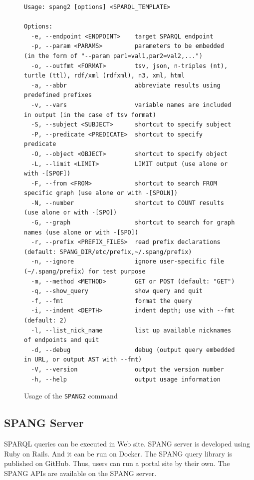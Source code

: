 \documentclass[runningheads]{llncs}
\begin{document}
\begin{figure}[!t]
\begin{scriptsize}
\begin{verbatim}
Usage: spang2 [options] <SPARQL_TEMPLATE>

Options:
  -e, --endpoint <ENDPOINT>    target SPARQL endpoint
  -p, --param <PARAMS>         parameters to be embedded (in the form of "--param par1=val1,par2=val2,...")
  -o, --outfmt <FORMAT>        tsv, json, n-triples (nt), turtle (ttl), rdf/xml (rdfxml), n3, xml, html
  -a, --abbr                   abbreviate results using predefined prefixes
  -v, --vars                   variable names are included in output (in the case of tsv format)
  -S, --subject <SUBJECT>      shortcut to specify subject
  -P, --predicate <PREDICATE>  shortcut to specify predicate
  -O, --object <OBJECT>        shortcut to specify object
  -L, --limit <LIMIT>          LIMIT output (use alone or with -[SPOF])
  -F, --from <FROM>            shortcut to search FROM specific graph (use alone or with -[SPOLN])
  -N, --number                 shortcut to COUNT results (use alone or with -[SPO])
  -G, --graph                  shortcut to search for graph names (use alone or with -[SPO])
  -r, --prefix <PREFIX_FILES>  read prefix declarations (default: SPANG_DIR/etc/prefix,~/.spang/prefix)
  -n, --ignore                 ignore user-specific file (~/.spang/prefix) for test purpose
  -m, --method <METHOD>        GET or POST (default: "GET")
  -q, --show_query             show query and quit
  -f, --fmt                    format the query
  -i, --indent <DEPTH>         indent depth; use with --fmt (default: 2)
  -l, --list_nick_name         list up available nicknames of endpoints and quit
  -d, --debug                  debug (output query embedded in URL, or output AST with --fmt)
  -V, --version                output the version number
  -h, --help                   output usage information

\end{verbatim}
\end{scriptsize}
\caption{Usage of the \texttt{SPANG2} command}
\label{fig:spang-command}
\end{figure}


\subsection{SPANG Server}
SPARQL queries can be executed in Web site.
SPANG server is developed using Ruby on Rails. And it can be run on Docker. The SPANG query library is published on GitHub. Thus, users can run a portal site by their own. The SPANG APIs are available on the SPANG server.
\end{document}
